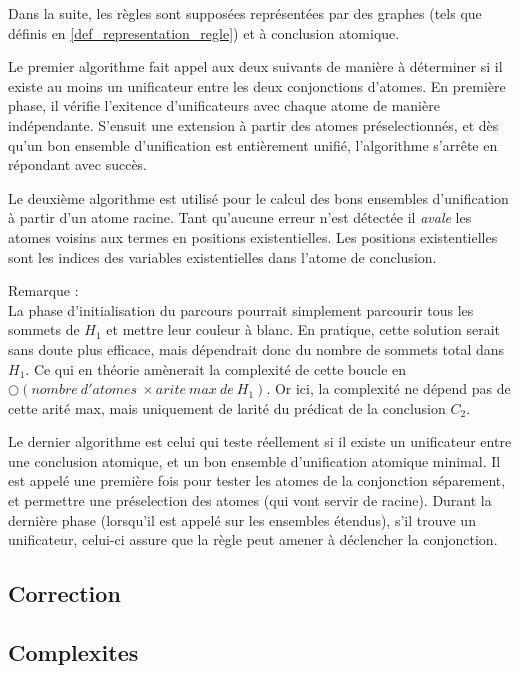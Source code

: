 	Dans la suite, les règles sont supposées représentées par des graphes (tels que
	définis en \ref{def_representation_regle}) et à conclusion atomique.

	Le premier algorithme fait appel aux deux suivants de manière à déterminer si il
	existe au moins un unificateur entre les deux conjonctions d'atomes.
	En première phase, il vérifie l'exitence d'unificateurs avec chaque atome de manière
	indépendante. S'ensuit une extension à partir des atomes préselectionnés, et dès
	qu'un bon ensemble d'unification est entièrement unifié, l'algorithme s'arrête en
	répondant avec succès.
	

	Le deuxième algorithme est utilisé pour le calcul des bons ensembles d'unification à
	partir d'un atome racine. Tant qu'aucune erreur n'est détectée il {\em avale} les atomes
	voisins aux termes en positions existentielles.
	Les positions existentielles sont les indices des variables existentielles dans
	l'atome de conclusion.
	

	Remarque : \\
	La phase d'initialisation du parcours pourrait simplement parcourir tous les sommets
	de $H_{1}$ et mettre leur couleur \`a blanc.
	En pratique, cette solution serait sans doute plus efficace, mais d\'ependrait donc
	du nombre de sommets total dans $H_{1}$.
	Ce qui en th\'eorie am\`enerait la complexit\'e de cette boucle en 
	$\bigcirc(nombre\ d'atomes\ \times arite\ max\ de\ H_{1})$.
	Or ici, la complexit\'e ne d\'epend pas de cette arit\'e max, mais uniquement de
	larit\'e du pr\'edicat de la conclusion $C_{2}$.

	Le dernier algorithme est celui qui teste réellement si il existe un unificateur
	entre une conclusion atomique, et un bon ensemble d'unification atomique minimal.
	Il est appelé une première fois pour tester les atomes de la conjonction séparement,
	et permettre une préselection des atomes (qui vont servir de racine).
	Durant la dernière phase (lorsqu'il est appelé sur les ensembles étendus), s'il trouve
	un unificateur, celui-ci assure que la règle peut amener à déclencher la conjonction.
	



\subsection{Correction}\label{grd_correction}

\subsection{Complexites}\label{grd_complexites}
	

